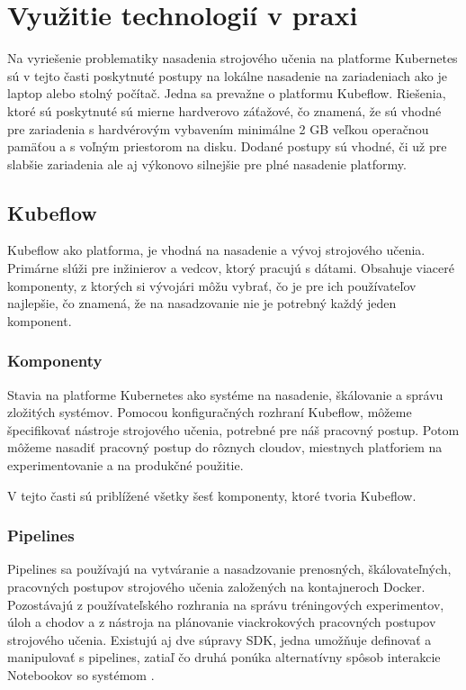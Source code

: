 
\chapter{Využitie technologií v praxi}
\label{methodology}

Na vyriešenie problematiky nasadenia strojového učenia na platforme Kubernetes sú v tejto časti poskytnuté postupy na lokálne nasadenie na zariadeniach ako je laptop alebo stolný počítač. Jedna sa prevažne o platformu Kubeflow. Riešenia, ktoré sú poskytnuté sú mierne hardverovo záťažové, čo znamená, že sú vhodné pre zariadenia s hardvérovým vybavením minimálne 2 GB veľkou operačnou pamäťou a s voľným priestorom na disku. Dodané postupy sú vhodné, či už pre slabšie zariadenia ale aj výkonovo silnejšie pre plné nasadenie platformy.

\section{Kubeflow}
Kubeflow ako platforma, je vhodná na nasadenie a vývoj strojového učenia. Primárne slúži pre inžinierov a vedcov, ktorý pracujú s dátami. Obsahuje viaceré komponenty, z ktorých si vývojári môžu vybrať, čo je pre ich používateľov najlepšie, čo znamená, že na nasadzovanie nie je potrebný každý jeden komponent.

\subsection{Komponenty}

Stavia na platforme Kubernetes ako systéme na nasadenie, škálovanie a správu zložitých systémov. Pomocou konfiguračných rozhraní Kubeflow, môžeme špecifikovať nástroje strojového učenia, potrebné pre náš pracovný postup. Potom môžeme nasadiť pracovný postup do rôznych cloudov, miestnych platforiem na experimentovanie a na produkčné použitie.

V tejto časti sú priblížené všetky šesť komponenty, ktoré tvoria Kubeflow.


\subsection*{Pipelines}

Pipelines sa používajú na vytváranie a nasadzovanie prenosných, škálovateľných, pracovných postupov strojového učenia založených na kontajneroch Docker. Pozostávajú z používateľského rozhrania na správu tréningových experimentov, úloh a chodov a z nástroja na plánovanie viackrokových pracovných postupov strojového učenia. Existujú aj dve súpravy SDK, jedna umožňuje definovať a manipulovať s pipelines, zatiaľ čo druhá ponúka alternatívny spôsob interakcie Notebookov so systémom \cite{pipe}.

